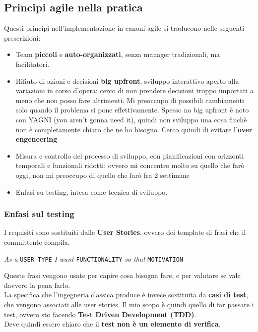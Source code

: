 \documentclass[a4paper,12pt]{article}
\begin{document}
\subsection{Principi agile nella pratica}
Questi principi nell'implementazione in canoni agile si traducono nelle seguenti prescrizioni:
\begin{itemize}
\item Team \textbf{piccoli} e \textbf{auto-organizzati}, senza manager tradizionali, ma facilitatori.
\item Rifiuto di azioni e decisioni \textbf{big upfront}, sviluppo interattivo aperto alla variazioni in corso d'opera: cerco di non prendere decisioni troppo importati a meno che non posso fare altrimenti. Mi preoccupo di possibili cambiamenti solo quando il problema si pone effettivamente. Spesso no big upfront è noto con YAGNI (you aren't gonna need it), quindi non sviluppo una cosa finchè non è completamente chiaro che ne ho bisogno. Cerco quindi di evitare l'\textbf{over engeneering}
\item Misura e controllo del processo di sviluppo, con pianificazioni con orizzonti temporali e funzionali ridotti: ovvero mi concentro molto su quello che farò oggi, non mi preoccupo di quello che farò fra 2 settimane
\item Enfasi su testing, intesa come tecnica di sviluppo.
\end{itemize}

\subsubsection{Enfasi sul testing}
I requisiti sono sostituiti dalle \textbf{User Stories}, ovvero dei template di frasi che il committente compila.
\begin{center}
\textit{As a} \texttt{USER TYPE} \textit{I want} \texttt{FUNCTIONALITY} \textit{so that} \texttt{MOTIVATION}
\end{center}
Queste frasi vengono usate per capire cosa bisogna fare, e per valutare se vale davvero la pena farlo.\\
La specifica che l'ingegneria classica produce è invece sostituita da \textbf{casi di test}, che vengono associati alle user stories. Il mio scopo è quindi quello di far passare i test, ovvero sto facendo \textbf{Test Driven Development (TDD)}.\\
Deve quindi essere chiaro che il \textbf{test non è un elemento di verifica}.

\end{document}
